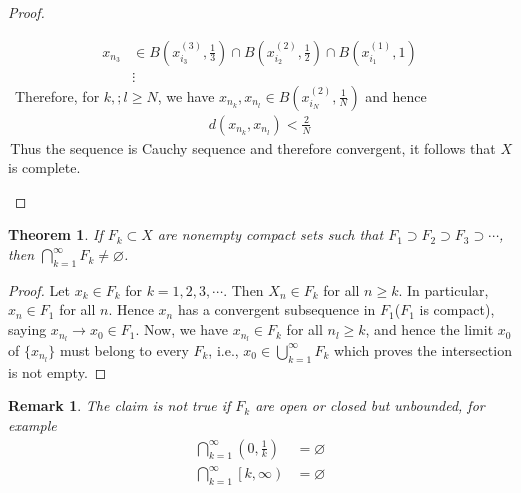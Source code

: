 \documentclass[12pt,leqno]{amsart}
\newtheorem{theorem}{Theorem}[section]
\newtheorem{remark}{Remark}[section]
\theoremstyle{definition}
\numberwithin{equation}{subsection}
\begin{document}
\begin{proof}
\begin{enumerate}
\begin{align*}
        x_{n_3} &\in B\left(x_{i_3}^{(3)},\frac{1}{3}\right)\cap B\left(x_{i_2}^{(2)},\frac{1}{2}\right)\cap B(x_{i_1}^{(1)},1)\\
        & \vdots
    \end{align*}
    \hspace*{1em}\, Therefore, for $k,;l\geq N$, we have $x_{n_k},x_{n_l}\in B\left(x_{i_N}^{(2)},\frac{1}{N}\right)$ and hence
    \begin{align*}
        d(x_{n_k},x_{n_l}) < \frac{2}{N}
    \end{align*}
    \hspace*{1em}\,Thus the sequence is Cauchy sequence and therefore convergent, it follows that $X$ is complete.
\end{enumerate}

\end{proof}

\begin{theorem}
If $F_k\subset X$ are nonempty compact sets such that $F_1\supset F_2\supset F_3\supset\cdots$, then $\bigcap^\infty_{k=1}F_k\neq\varnothing$.
\end{theorem}
\begin{proof}
Let $x_k\in F_k$ for $k = 1,2,3,\cdots$. Then $X_n\in F_k$ for all $n\geq k$. In particular, $x_n\in F_1$ for all $n$. Hence $x_n$ has a convergent subsequence  in $F_1$($F_1$ is compact), saying $x_{n_l}\to x_0\in F_1$. Now, we have $x_{n_l}\in F_k$ for all $n_l \geq k$, and hence the limit $x_0$ of $\{x_{n_l}\}$ must belong to every $F_k$, i.e., $x_0\in \bigcup^\infty_{k=1}F_k$ which proves the intersection is not empty.
\end{proof}
\begin{remark}
The claim is not true if $F_k$ are open or closed but unbounded, for example
\begin{align*}
    \bigcap^\infty_{k=1}\left(0,\frac{1}{k}\right) &= \varnothing \\
    \bigcap^\infty_{k=1}\left[k,\infty\right) &= \varnothing
\end{align*}
\end{remark}

\medskip
\end{document}
